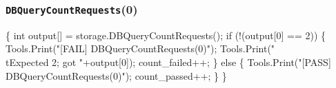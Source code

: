 \documentclass{article}
\def\nwendcode{\endtrivlist \endgroup}
\let\nwdocspar=\par
\begin{document}
\subsubsection{{\tt{}DBQueryCountRequests}(0)}
\nwenddocs{}\endmoddef{}
\{
  int output[] = storage.DBQueryCountRequests();
  if (!(output[0] == 2)) \{
    Tools.Print("[FAIL] DBQueryCountRequests(0)");
    Tools.Print("\\tExpected 2; got "+output[0]);
    count_failed++;
  \} else \{
    Tools.Print("[PASS] DBQueryCountRequests(0)");
    count_passed++;
  \}
\}
\nwendcode{}\nwdocspar
\end{document}
